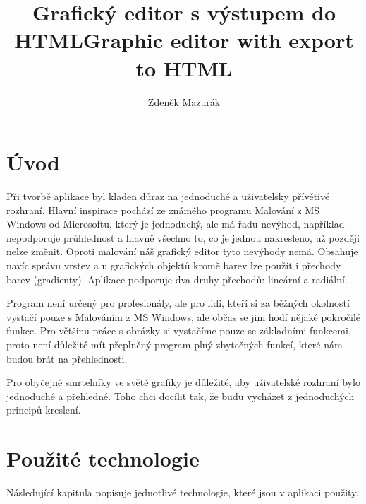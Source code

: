 \documentclass[
  field=inf,
  biblatex,
  glossaries,
  index
]{kidiplom}
\title{Grafický editor s výstupem do HTML}
\title[english]{Graphic editor with export to HTML}
\subtitle{}
\subtitle[english]{}
\author{Zdeněk Mazurák}
\begin{document}
\maketitle



\newcommand{\BibLaTeX}{\textsc{Bib}\LaTeX}

\section{Úvod}

Při tvorbě aplikace byl kladen důraz na jednoduché a uživatelsky přívětivé rozhraní. Hlavní inspirace pochází ze známého programu Malování z MS Windows od Microsoftu, který je jednoduchý, ale má řadu nevýhod, například nepodporuje průhlednost a hlavně všechno to, co je jednou nakresleno, už později nelze změnit. Oproti malování náš grafický editor tyto nevýhody nemá. Obsahuje navíc správu vrstev a u grafických objektů kromě barev lze použít i přechody barev (gradienty). Aplikace podporuje dva druhy přechodů: lineární a radiální.

Program není určený pro profesionály, ale pro lidi, kteří si za běžných okolností vystačí pouze s Malováním z MS Windows, ale občas se jim hodí nějaké pokročilé funkce. Pro většinu práce s obrázky si vystačíme pouze se základními funkcemi, proto není důležité mít přeplněný program plný zbytečných funkcí, které nám budou brát na přehlednosti.

Pro obyčejné smrtelníky ve světě grafiky je důležité, aby uživatelské rozhraní bylo jednoduché a přehledné. Toho chci docílit tak, že budu vycházet z jednoduchých principů kreslení.

\newpage

\section{Použité technologie}

Následující kapitula popisuje jednotlivé technologie, které jsou v aplikaci použity.
\end{document}
